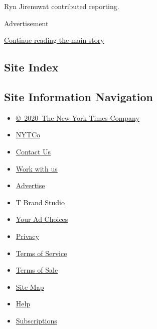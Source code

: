 Ryn Jirenuwat contributed reporting.

Advertisement

\protect\hyperlink{after-bottom}{Continue reading the main story}

\hypertarget{site-index}{%
\subsection{Site Index}\label{site-index}}

\hypertarget{site-information-navigation}{%
\subsection{Site Information
Navigation}\label{site-information-navigation}}

\begin{itemize}
\tightlist
\item
  \href{https://help.nytimes3xbfgragh.onion/hc/en-us/articles/115014792127-Copyright-notice}{©~2020~The
  New York Times Company}
\end{itemize}

\begin{itemize}
\tightlist
\item
  \href{https://www.nytco.com/}{NYTCo}
\item
  \href{https://help.nytimes3xbfgragh.onion/hc/en-us/articles/115015385887-Contact-Us}{Contact
  Us}
\item
  \href{https://www.nytco.com/careers/}{Work with us}
\item
  \href{https://nytmediakit.com/}{Advertise}
\item
  \href{http://www.tbrandstudio.com/}{T Brand Studio}
\item
  \href{https://www.nytimes3xbfgragh.onion/privacy/cookie-policy\#how-do-i-manage-trackers}{Your
  Ad Choices}
\item
  \href{https://www.nytimes3xbfgragh.onion/privacy}{Privacy}
\item
  \href{https://help.nytimes3xbfgragh.onion/hc/en-us/articles/115014893428-Terms-of-service}{Terms
  of Service}
\item
  \href{https://help.nytimes3xbfgragh.onion/hc/en-us/articles/115014893968-Terms-of-sale}{Terms
  of Sale}
\item
  \href{https://spiderbites.nytimes3xbfgragh.onion}{Site Map}
\item
  \href{https://help.nytimes3xbfgragh.onion/hc/en-us}{Help}
\item
  \href{https://www.nytimes3xbfgragh.onion/subscription?campaignId=37WXW}{Subscriptions}
\end{itemize}
